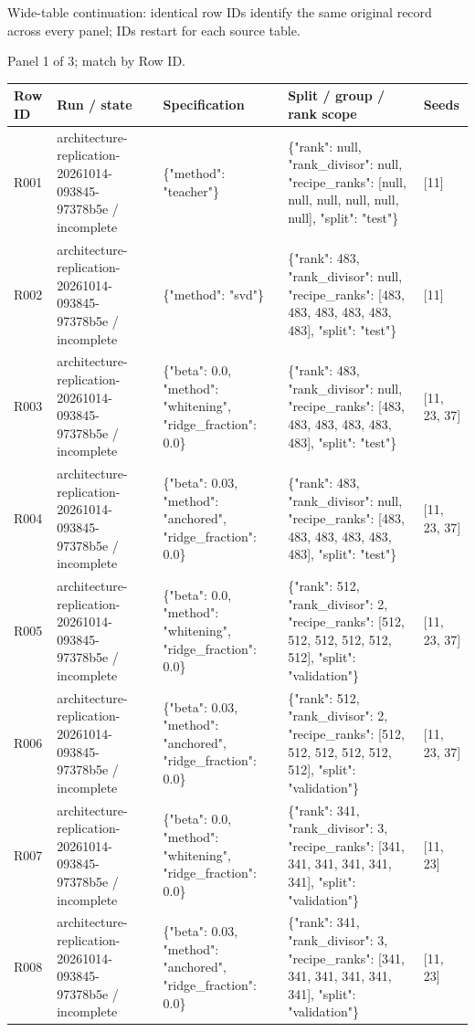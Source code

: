 \documentclass[10pt]{article}
\begin{document}
Wide-table continuation: identical row IDs identify the same original record across every panel; IDs restart for each source table.
\par\noindent Panel 1 of 3; match by Row ID.
{\scriptsize\setlength{\tabcolsep}{2pt}
\begin{longtable}{p{}p{}p{}p{}p{}}
Row ID & Run / state & Specification & Split / group / rank scope & Seeds \\
\hline\endhead
R001 & architecture-replication-20261014-093845-97378b5e / incomplete & \{"method": "teacher"\} & \{"rank": null, "rank\_divisor": null, "recipe\_ranks": [null, null, null, null, null, null], "split": "test"\} & [11] \\
R002 & architecture-replication-20261014-093845-97378b5e / incomplete & \{"method": "svd"\} & \{"rank": 483, "rank\_divisor": null, "recipe\_ranks": [483, 483, 483, 483, 483, 483], "split": "test"\} & [11] \\
R003 & architecture-replication-20261014-093845-97378b5e / incomplete & \{"beta": 0.0, "method": "whitening", "ridge\_fraction": 0.0\} & \{"rank": 483, "rank\_divisor": null, "recipe\_ranks": [483, 483, 483, 483, 483, 483], "split": "test"\} & [11, 23, 37] \\
R004 & architecture-replication-20261014-093845-97378b5e / incomplete & \{"beta": 0.03, "method": "anchored", "ridge\_fraction": 0.0\} & \{"rank": 483, "rank\_divisor": null, "recipe\_ranks": [483, 483, 483, 483, 483, 483], "split": "test"\} & [11, 23, 37] \\
R005 & architecture-replication-20261014-093845-97378b5e / incomplete & \{"beta": 0.0, "method": "whitening", "ridge\_fraction": 0.0\} & \{"rank": 512, "rank\_divisor": 2, "recipe\_ranks": [512, 512, 512, 512, 512, 512], "split": "validation"\} & [11, 23, 37] \\
R006 & architecture-replication-20261014-093845-97378b5e / incomplete & \{"beta": 0.03, "method": "anchored", "ridge\_fraction": 0.0\} & \{"rank": 512, "rank\_divisor": 2, "recipe\_ranks": [512, 512, 512, 512, 512, 512], "split": "validation"\} & [11, 23, 37] \\
R007 & architecture-replication-20261014-093845-97378b5e / incomplete & \{"beta": 0.0, "method": "whitening", "ridge\_fraction": 0.0\} & \{"rank": 341, "rank\_divisor": 3, "recipe\_ranks": [341, 341, 341, 341, 341, 341], "split": "validation"\} & [11, 23] \\
R008 & architecture-replication-20261014-093845-97378b5e / incomplete & \{"beta": 0.03, "method": "anchored", "ridge\_fraction": 0.0\} & \{"rank": 341, "rank\_divisor": 3, "recipe\_ranks": [341, 341, 341, 341, 341, 341], "split": "validation"\} & [11, 23] \\

\end{longtable}}
\end{document}
